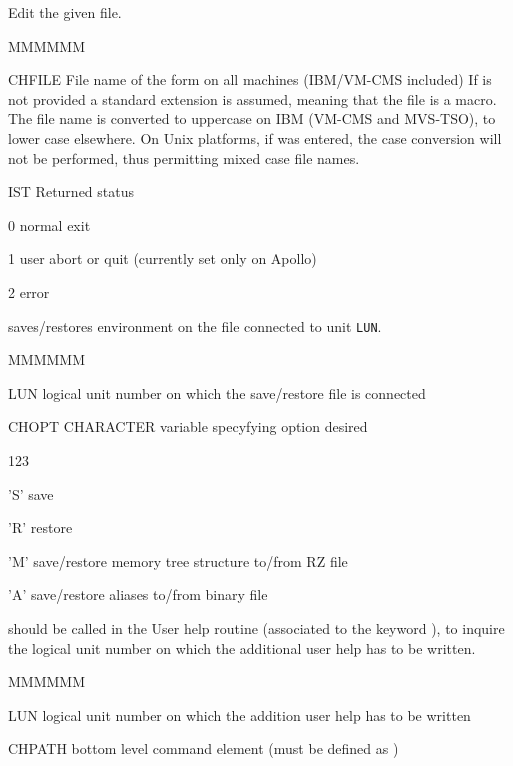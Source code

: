 \Action Edit the given file.
\Pdesc\begin{DLtt}{MMMMMM}
\item[CHFILE] File name of the form  on all machines (IBM/VM-CMS included)
If  is not provided
a standard extension  is assumed, meaning that the file is a macro.
The file name is converted to uppercase on IBM (VM-CMS and MVS-TSO),
to lower case elsewhere.
On Unix platforms, if  was entered,
the case conversion will not be performed,
thus permitting mixed case file names.
\item[IST] Returned status 
\begin{DLtt}{12}
\item[0] normal exit
\item[1] user abort or quit (currently set only on Apollo)
\item[2] error
\end{DLtt}
\end{DLtt}


\Action saves/restores \KUIP{} environment on the file connected to unit {\tt LUN}.
\Pdesc\begin{DLtt}{MMMMMM}
\item[LUN] logical unit number on which the save/restore file is connected
\item[CHOPT] CHARACTER variable specyfying option desired
\begin{DLtt}{123}
\item['S'] save
\item['R'] restore
\item['M'] save/restore memory tree structure to/from RZ file
\item['A'] save/restore aliases to/from binary file
\end{DLtt}
\end{DLtt}

\Action should be called in the User help routine (associated to the \CDF{}
keyword ), to inquire the logical unit number on which
the additional user help has to be written.
\Pdesc\begin{DLtt}{MMMMMM}
\item[LUN] logical unit number on which the addition user help has to be written
\item[CHPATH] bottom level command element (must be defined as )
\end{DLtt}

